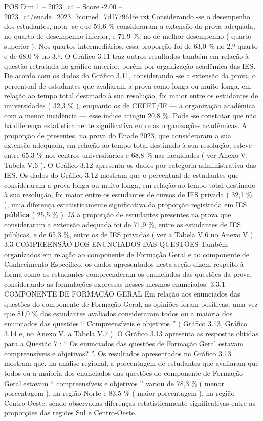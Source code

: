 \begin{textsample}{POS Dim 1 – 2023\_c4 – Score -2.00 – 2023\_c4/enade\_2023\_biomed\_7d177961fe.txt}
Considerando -se o desempenho dos estudantes, nota -se que 59,6 \% consideraram a extensão da prova adequada, no quarto de desempenho inferior, e 71,9 \%, no de melhor desempenho ( quarto superior ).
Nos quartos intermediários, essa proporção foi de 63,0 \% no 2.º quarto e de 68,0 \% no 3.º.
O Gráfico 3.11 traz outros resultados também em relação à questão retratada no gráfico anterior, porém por organização acadêmica das IES.
De acordo com os dados do Gráfico 3.11, considerando -se a extensão da prova, o percentual de estudantes que avaliaram a prova como longa ou muito longa, em relação ao tempo total destinado à sua resolução, foi maior entre os estudantes de universidades ( 32,3 \% ), enquanto os de CEFET/IF — a organização acadêmica com a menor incidência — esse índice atingiu 20,8 \%.
Pode -se constatar que não há diferença estatisticamente significativa entre as organizações acadêmicas.
A proporção de presentes, na prova do Enade 2023, que consideraram a sua extensão adequada, em relação ao tempo total destinado à sua resolução, esteve entre 65,3 \% nos centros universitários e 68,8 \% nas faculdades ( ver Anexo V, Tabela V.6 ).
O Gráfico 3.12 apresenta os dados por categoria administrativa das IES.
Os dados do Gráfico 3.12 mostram que o percentual de estudantes que consideraram a prova longa ou muito longa, em relação ao tempo total destinado à sua resolução, foi maior entre os estudantes de cursos de IES privada ( 32,1 \% ), uma diferença estatisticamente significativa da proporção registrada em IES \textbf{pública} ( 25,5 \% ).
Já a proporção de estudantes presentes na prova que consideraram a extensão adequada foi de 71,9 \%, entre os estudantes de IES públicas, e de 65,3 \%, entre os de IES privadas ( ver a Tabela V.6 no Anexo V ). 3.3 COMPREENSÃO DOS ENUNCIADOS DAS QUESTÕES Também organizados em relação ao componente de Formação Geral e ao componente de Conhecimento Específico, os dados apresentados nesta seção dizem respeito à forma como os estudantes compreenderam os enunciados das questões da prova, considerando as formulações expressas nesses mesmos enunciados. 3.3.1 COMPONENTE DE FORMAÇÃO GERAL Em relação aos enunciados das questões do componente de Formação Geral, as opiniões foram positivas, uma vez que 81,0 \% dos estudantes avaliados consideraram todos ou a maioria dos enunciados das questões “ Compreensíveis e objetivos ” ( Gráfico 3.13, Gráfico 3.14 e, no Anexo V, a Tabela V.7 ).
O Gráfico 3.13 apresenta as respostas obtidas para a Questão 7 : “ Os enunciados das questões de Formação Geral estavam compreensíveis e objetivos? ”.
Os resultados apresentados no Gráfico 3.13 mostram que, na análise regional, a porcentagem de estudantes que avaliaram que todos ou a maioria dos enunciados das questões do componente de Formação Geral estavam “ compreensíveis e objetivos ” variou de 78,3 \% ( menor porcentagem ), na região Norte e 83,5 \% ( maior porcentagem ), na região Centro-Oeste, sendo observadas diferenças estatisticamente significativas entre as proporções das regiões Sul e Centro-Oeste.

\end{textsample}
